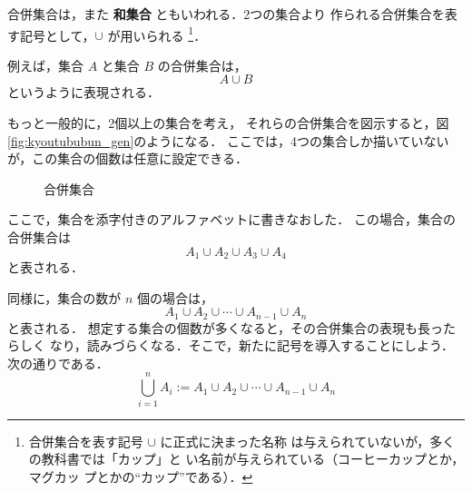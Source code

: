                     合併集合は，また \textbf{和集合} ともいわれる．2つの集合より
                    作られる合併集合を表す記号として，$\cup$ が用いられる
                        \footnote{
                            合併集合を表す記号 $\cup$ に正式に決まった名称
                            は与えられていないが，多くの教科書では「カップ」と
                            い名前が与えられている（コーヒーカップとか，マグカッ
                            プとかの“カップ”である）．
                        }．

                    例えば，集合 $A$ と集合 $B$ の合併集合は，
                        \begin{equation*}
                            A \cup B
                        \end{equation*}
                    というように表現される．

                    もっと一般的に，2個以上の集合を考え，
                    それらの合併集合を図示すると，図\ref{fig:kyoutububun_gen}のようになる．
                    ここでは，4つの集合しか描いていないが，この集合の個数は任意に設定できる．
                        \begin{figure}[hbt]
                            \begin{center}
                                \caption{合併集合}
                                \label{fig:gappei_shugo}
                            \end{center}
                        \end{figure}

                    ここで，集合を添字付きのアルファベットに書きなおした．
                    この場合，集合の合併集合は
                        \begin{equation*}
                            A_{1} \cup A_{2} \cup A_{3} \cup A_{4}
                        \end{equation*}
                    と表される．

                    同様に，集合の数が $n$ 個の場合は，
                        \begin{equation*}
                            A_{1} \cup A_{2} \cup \cdots \cup A_{n-1} \cup A_{n}
                        \end{equation*}
                    と表される．
                    想定する集合の個数が多くなると，その合併集合の表現も長ったらしく
                    なり，読みづらくなる．そこで，新たに記号を導入することにしよう．
                    次の通りである．
                        \begin{equation*}
                            \bigcup_{i=1}^{n} A_{i}
                                :=  A_{1} \cup A_{2} \cup \cdots \cup A_{n-1} \cup A_{n}
                        \end{equation*}

